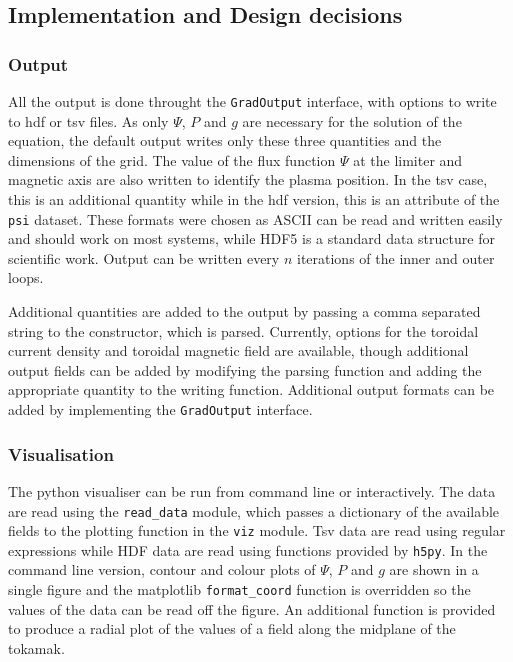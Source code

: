 \documentclass[paper=letter, fontsize=11pt]{scrartcl} %
\begin{document}
\subsection{Implementation and Design decisions}

\subsubsection{Output}
All the output is done throught the \texttt{GradOutput} interface, with options to write to hdf or tsv files. As only $\Psi$, $P$ and $g$ are necessary for the solution of the equation, the default output writes only these three quantities and the dimensions of the grid. The value of the flux function $\Psi$ at the limiter and magnetic axis are also written to identify the plasma position. In the tsv case, this is an additional quantity while in the hdf version, this is an attribute of the \texttt{psi} dataset. These formats were chosen as ASCII can be read and written easily and should work on most systems, while HDF5 is a standard data structure for scientific work. Output can be written every $n$ iterations of the inner and outer loops. 

Additional quantities are added to the output by passing a comma separated string to the constructor, which is parsed. Currently, options for the toroidal current density and toroidal magnetic field are available, though additional output fields can be added by modifying the parsing function and adding the appropriate quantity to the writing function. Additional output formats can be added by implementing the \texttt{GradOutput} interface.

\subsubsection{Visualisation}

The python visualiser can be run from command line or interactively. The data are read using the \texttt{read\_data} module, which passes a dictionary of the available fields to the plotting function in the \texttt{viz} module. Tsv data are read using regular expressions while HDF data are read using functions provided by \texttt{h5py}. In the command line version, contour and colour plots of $\Psi$, $P$ and $g$ are shown in a single figure and the matplotlib \texttt{format\_coord} function is overridden so the values of the data can be read off the figure. An additional function is provided to produce a radial plot of the values of a field along the midplane of the tokamak. 
\end{document}
